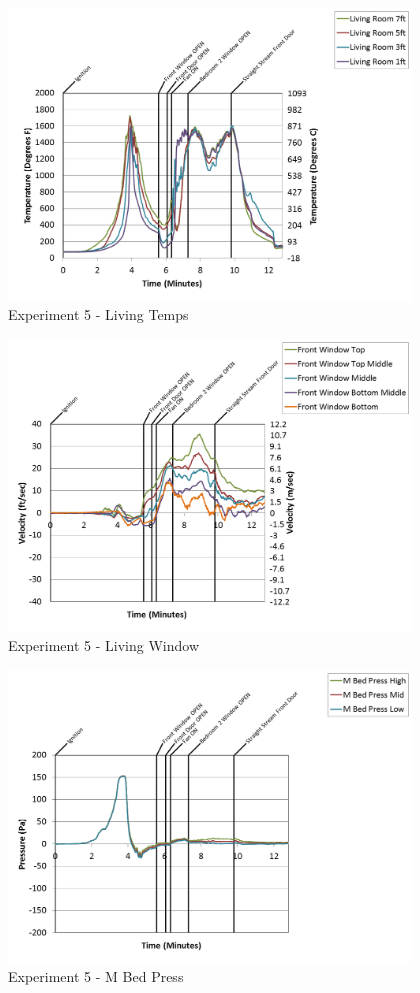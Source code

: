 \documentclass{article}
\begin{document}
\begin{appendices}
\begin{figure}[h!]
	\centering
	\includegraphics[height=3.05in]{0_Images/Results_Charts/Exp_5_Charts/LivingTemps.png}
	\caption{Experiment 5 - Living Temps}
\end{figure}

\clearpage

\begin{figure}[h!]
	\centering
	\includegraphics[height=3.05in]{0_Images/Results_Charts/Exp_5_Charts/LivingWindow.png}
	\caption{Experiment 5 - Living Window}
\end{figure}


\begin{figure}[h!]
	\centering
	\includegraphics[height=3.05in]{0_Images/Results_Charts/Exp_5_Charts/MBedPress.png}
	\caption{Experiment 5 - M Bed Press}
\end{figure}


\end{appendices}
\end{document}
